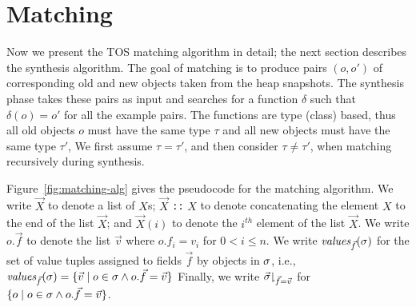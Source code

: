 \documentclass[natbib]{sigplanconf}
\newcommand{\code}[1]{\lstinline|#1|\xspace}
\newcommand{\TOS}{TOS\xspace}
\newcommand{\kathryn}[1]{\textcolor{blue}{Kathryn: #1}}
\newcommand{\mwh}[1]{\textcolor{blue}{Mike: #1}}
\begin{document}




\section{Matching}
\label{sec:matching}

Now we present the \TOS matching algorithm in detail; the next section
describes the synthesis algorithm.  The goal of matching is to produce
pairs $(o,o')$ of corresponding old and new objects taken from the
heap snapshots.  The synthesis phase takes these pairs as input and
searches for a function $\delta$ such that $\delta(o) = o'$ for all
the example pairs.  The functions are type (class) based, thus all old
objects $o$ must have the same type $\tau$ and all new objects must
have the same type $\tau'$, We first assume $\tau = \tau'$, and then
consider $\tau \neq \tau'$, when matching recursively during
synthesis.

Figure~\ref{fig:matching-alg} gives the pseudocode for the matching
algorithm.  We write $\vec{X}$ to denote a list of $X$s; $\vec{X}$
\code{::} $X$ to denote concatenating the element $X$ to the end of
the list $\vec{X}$; and $\vec{X}(i)$ to denote the $i^{th}$ element of
the list $\vec{X}$.  We write $o.\vec{f}$ to denote the list $\vec{v}$
where $o.f_i = v_i$ for $0 < i \leq n$.  We write
$\textit{values}_{\vec{f}}(\sigma)$ for the set of value tuples assigned to
fields $\vec{f}$ by objects in $\sigma$, i.e., $\textit{values}_{\vec{f}}(\sigma) =
\{\vec{v} \mid o \in \sigma \wedge o.\vec{f} = \vec{v} \}$ Finally, we
write $\vec{\sigma} \mathord\downharpoonright_{\vec{f} = \vec{v}}$ for $\{o \mid o \in
\sigma \wedge o.\vec{f} = \vec{v}\}$.
\end{document}
